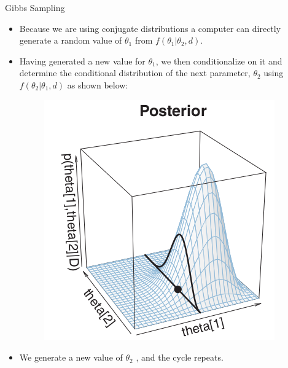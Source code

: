 \documentclass[handout]{beamer}
\begin{document}
\begin{frame}{Gibbs Sampling}
\scriptsize{


\begin{itemize}

\item Because we are using conjugate distributions a computer can directly generate a random  value of $\theta_1$ from $f(\theta_1|\theta_2 , d)$. 

\item Having generated a new value for $\theta_1$, we then conditionalize on it and determine the conditional distribution of the next parameter, $\theta_2$ using $f(\theta_2|\theta_1 , d)$  as shown below:

 \begin{figure}[h!]
	\centering
	\includegraphics[scale=0.4]{pics/gibbs2.png}
	\end{figure} 

\item We generate a new value of $\theta_2$ , and the cycle repeats.



\end{itemize}


} 
\end{frame}
\end{document}
